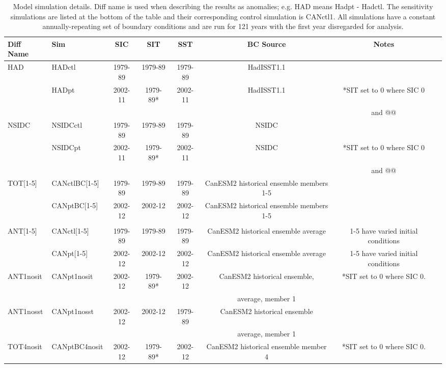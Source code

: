 \documentclass[twocol]{ametsoc}
\begin{document}
\begin{table}[t]
\caption{Model simulation details. Diff name is used when describing the results as anomalies; e.g. HAD means Hadpt - Hadctl. The sensitivity simulations are listed at the bottom of the table and their corresponding control simulation is CANctl1. All simulations have a constant annually-repeating set of boundary conditions and are run for 121 years with the first year disregarded for analysis.}\label{simstbl}
\begin{center}
\begin{tabular}{llcccccc}
\hline\hline
Diff Name & Sim & SIC & SIT & SST & BC Source & Notes\\
\hline
HAD &  HADctl   & 1979-89 & 1979-89 & 1979-89 & HadISST1.1 \\
         & HADpt &   2002-11 & 1979-89* & 2002-11 & HadISST1.1 & *SIT set to 0 where SIC 0 \\
            &                 &               &                &                &                     &     and @@\\
 NSIDC & NSIDCctl  &1979-89 & 1979-89 & 1979-89 & NSIDC \\
             & NSIDCpt &   2002-11 & 1979-89* & 2002-11 & NSIDC & *SIT set to 0 where SIC 0 \\
               &              &                &                 &               &              &   and @@\\
 TOT[1-5] & CANctlBC[1-5] & 1979-89 & 1979-89 & 1979-89  & CanESM2 historical ensemble members 1-5  & \\
                & CANptBC[1-5] &   2002-12 & 2002-12 & 2002-12 &  CanESM2 historical ensemble members 1-5  & \\
 \\
 ANT[1-5] &  CANctl[1-5] &    1979-89 & 1979-89 & 1979-89 & CanESM2 historical ensemble average & 1-5 have varied initial conditions \\
                   & CANpt[1-5] & 2002-12 & 2002-12 & 2002-12 &  CanESM2 historical ensemble average &  1-5 have varied initial conditions \\
  \hline
 \hline
 ANT1nosit   & CANpt1nosit &     2002-12 & 1979-89* & 2002-12 &  CanESM2 historical ensemble, & *SIT set to 0 where SIC 0. \\
                       &                       &                 &                  &              &       average, member 1             & \\
ANT1nosst  &  CANpt1nosst &      2002-12 & 2002-12 & 1979-89 &  CanESM2 historical ensemble  & \\
                        &                       &                 &                  &              &       average, member 1             & \\
TOT4nosit   &  CANptBC4nosit  &    2002-12 & 1979-89* & 2002-12 &  CanESM2 historical ensemble member 4 & *SIT set to 0 where SIC 0. \\
\hline
\end{tabular}
\end{center}
\end{table}
\end{document}
